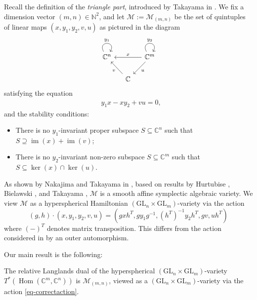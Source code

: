 \documentclass[11pt]{article}
\theoremstyle{definition}
\theoremstyle{plain}
\theoremstyle{remark}
\newcommand{\GL}{\mathrm{GL}}
\newcommand{\numberset}{\mathbb}
\newcommand{\C}{\numberset{C}}
\newcommand{\N}{\numberset{N}}
\DeclareMathOperator{\im}{im}
\DeclareMathOperator{\Hom}{Hom}
\begin{document}
        Recall the definition of the \emph{triangle part}, introduced by Takayama in \cite{Takayama2016}. We fix a dimension vector $(m,n) \in \N^2$, and let $\mathcal{M} := \mathcal{M}_{(m,n)}$ be the set of quintuples of linear maps $(x,y_1,y_2,v,u)$ as pictured in the diagram
        \[
            \begin{tikzcd}[column sep = small]
                \C^n  \arrow[out=120,in=60,loop,looseness=5,"y_1"] & & \C^m \arrow[ll, "x"']\arrow[out=120,in=60,loop,looseness=5,"y_2"] \arrow[ld, "u"] \\
                & \C \arrow[lu, "v"]& 
            \end{tikzcd}
        \]
        satisfying the equation
        \begin{align*}
            & y_1x-xy_2+vu=0,
        \end{align*}
        and the stability conditions:
        \begin{itemize}
            \item There is no $y_1$-invariant proper subspace $S \subseteq \C^n$ such that $S \supseteq \im(x)+\im(v)$;
            \item There is no $y_2$-invariant non-zero subspace $S \subseteq \C^m$ such that $S \subseteq \ker(x) \cap\ker(u)$.
        \end{itemize}
        As shown by Nakajima and Takayama in \cite[Section 3.1]{NakajimaTakayama2017}, based on results by Hurtubise \cite{Hurtubise1989}, Bielawski \cite{Bielawski1997}, and Takayama \cite{Takayama2016}, $\mathcal{M}$ is a smooth affine symplectic algebraic variety. We view $\mathcal{M}$ as a hyperspherical Hamiltonian $(\GL_n \times \GL_m)$-variety via the action
        \begin{equation}
            (g,h) \cdot (x,y_1,y_2,v,u) = (gxh^T,gy_1g^{-1},(h^{T})^{-1}y_2h^T,gv,uh^{T}) \label{eq-correctaction}
        \end{equation}
        where $(-)^T$ denotes matrix transposition. This differs from the action considered in \cite{NakajimaTakayama2017} by an outer automorphism.
        
        Our main result is the following: 
        
        \begin{thm}\label{thm-main}
            The relative Langlands dual of the hyperspherical $(\GL_n \times \GL_m)$-variety $T^*(\Hom(\C^m,\C^n))$ is $\mathcal{M}_{(m,n)}$, viewed as a $(\GL_n \times \GL_m)$-variety via the action \eqref{eq-correctaction}.
        \end{thm}
\end{document}
